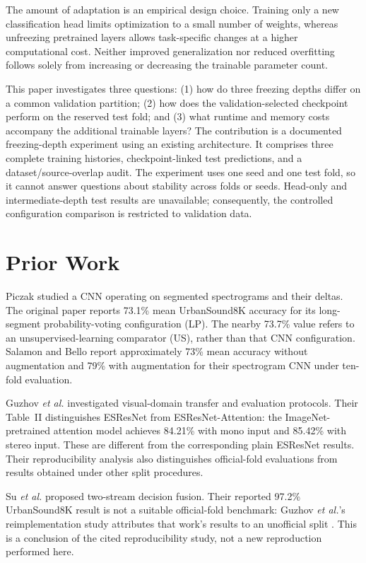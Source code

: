 \documentclass[conference]{IEEEtran}
\begin{document}
The amount of adaptation is an empirical design choice. Training only a new classification head limits optimization to a small number of weights, whereas unfreezing pretrained layers allows task-specific changes at a higher computational cost. Neither improved generalization nor reduced overfitting follows solely from increasing or decreasing the trainable parameter count.

This paper investigates three questions: (1) how do three freezing depths differ on a common validation partition; (2) how does the validation-selected checkpoint perform on the reserved test fold; and (3) what runtime and memory costs accompany the additional trainable layers? The contribution is a documented freezing-depth experiment using an existing architecture. It comprises three complete training histories, checkpoint-linked test predictions, and a dataset/source-overlap audit. The experiment uses one seed and one test fold, so it cannot answer questions about stability across folds or seeds. Head-only and intermediate-depth test results are unavailable; consequently, the controlled configuration comparison is restricted to validation data.

\section{Prior Work}\label{sec:related}
Piczak \cite{piczak2015cnn} studied a CNN operating on segmented spectrograms and their deltas. The original paper reports 73.1\% mean UrbanSound8K accuracy for its long-segment probability-voting configuration (LP). The nearby 73.7\% value refers to an unsupervised-learning comparator (US), rather than that CNN configuration. Salamon and Bello \cite{salamon2017augmentation} report approximately 73\% mean accuracy without augmentation and 79\% with augmentation for their spectrogram CNN under ten-fold evaluation.

Guzhov \emph{et al.} \cite{guzhov2020esresnet} investigated visual-domain transfer and evaluation protocols. Their Table~II distinguishes ESResNet from ESResNet-Attention: the ImageNet-pretrained attention model achieves 84.21\% with mono input and 85.42\% with stereo input. These are different from the corresponding plain ESResNet results. Their reproducibility analysis also distinguishes official-fold evaluations from results obtained under other split procedures.

Su \emph{et al.} \cite{su2019fusion} proposed two-stream decision fusion. Their reported 97.2\% UrbanSound8K result is not a suitable official-fold benchmark: Guzhov \emph{et al.}'s reimplementation study attributes that work's results to an unofficial split \cite{guzhov2020esresnet}. This is a conclusion of the cited reproducibility study, not a new reproduction performed here.
\end{document}
